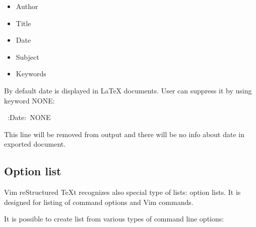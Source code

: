 \documentclass[12pt]{article}
\begin{document}
\begin{itemize}
\item
Author

\item
Title

\item
Date

\item
Subject

\item
Keywords
\end{itemize}

By default date is displayed in \LaTeX{} documents. User can suppress it by using
keyword NONE:

\begin{ttfamily}\begin{flushleft}
\mbox{~:Date:~NONE}\\
\end{flushleft}\end{ttfamily}

This line will be removed from output and there will be no info about date in
exported document.

\hypertarget{loption-list}{}
\subsection{Option list}

Vim reStructured \TeX{}t recognizes also special type of lists: option lists. It is
designed for listing of command options and Vim commands.

It is possible to create list from various types of command line
options:
\end{document}
